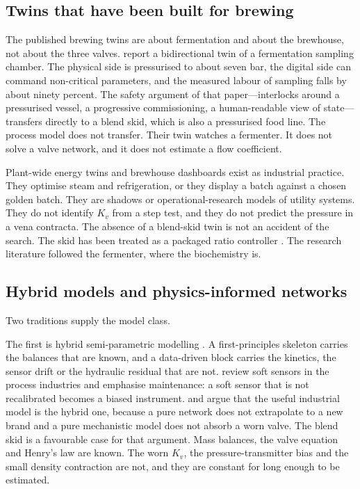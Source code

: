 \subsection{Twins that have been built for brewing}

The published brewing twins are about fermentation and about the brewhouse, not about the three valves. \citet{goffi2025} report a bidirectional twin of a fermentation sampling chamber. The physical side is pressurised to about seven bar, the digital side can command non-critical parameters, and the measured labour of sampling falls by about ninety percent. The safety argument of that paper---interlocks around a pressurised vessel, a progressive commissioning, a human-readable view of state---transfers directly to a blend skid, which is also a pressurised food line. The process model does not transfer. Their twin watches a fermenter. It does not solve a valve network, and it does not estimate a flow coefficient.

Plant-wide energy twins and brewhouse dashboards exist as industrial practice. They optimise steam and refrigeration, or they display a batch against a chosen golden batch. They are shadows or operational-research models of utility systems. They do not identify $K_v$ from a step test, and they do not predict the pressure in a vena contracta. The absence of a blend-skid twin is not an accident of the search. The skid has been treated as a packaged ratio controller \citep{centec2024}. The research literature followed the fermenter, where the biochemistry is.

\subsection{Hybrid models and physics-informed networks}

Two traditions supply the model class.

The first is hybrid semi-parametric modelling \citep{vonstosch2014,sansana2021,kadlec2009}. A first-principles skeleton carries the balances that are known, and a data-driven block carries the kinetics, the sensor drift or the hydraulic residual that are not. \citet{kadlec2009} review soft sensors in the process industries and emphasise maintenance: a soft sensor that is not recalibrated becomes a biased instrument. \citet{vonstosch2014} and \citet{sansana2021} argue that the useful industrial model is the hybrid one, because a pure network does not extrapolate to a new brand and a pure mechanistic model does not absorb a worn valve. The blend skid is a favourable case for that argument. Mass balances, the valve equation and Henry's law are known. The worn $K_v$, the pressure-transmitter bias and the small density contraction are not, and they are constant for long enough to be estimated.

